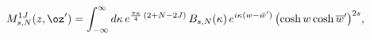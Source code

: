 \begin{equation}
M^{1J}_{s,N}(z,\oz')=\int_{-\infty}^{\infty}d\kappa\,
e^{\frac{\pi \kappa}{4}\,(2+N-2J)}
\,B_{s,N}(\kappa)\,
e^{i\kappa(w-\bar{w}')}\,
\bigl(
\cosh w\cosh\overline{w}'
\bigr)^{2s},
\end{equation}

